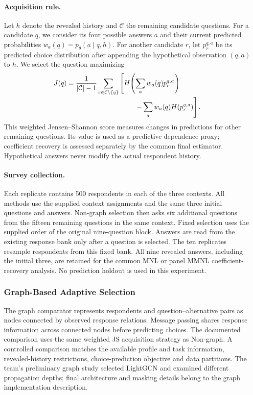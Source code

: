 \paragraph{Acquisition rule.}
Let $h$ denote the revealed history and $\mathcal C$ the remaining candidate
questions. For a candidate $q$, we consider its four possible answers $a$ and
their current predicted probabilities $w_a(q)=p_\theta(a\mid q,h)$.
For another candidate $r$, let $p_r^{q,a}$ be its predicted choice distribution
after appending the hypothetical observation $(q,a)$ to $h$. We select the
question maximizing
\begin{equation}
\begin{aligned}
 J(q) &= \frac{1}{|\mathcal C|-1}
     \sum_{r\in\mathcal C\setminus\{q\}}\left[
       H\!\left(\sum_a w_a(q)p_r^{q,a}\right)\right.\\[-2pt]
 &\hspace{35mm}\left.-\sum_a w_a(q)H(p_r^{q,a})\right].
\end{aligned}
\end{equation}
This weighted Jensen--Shannon score measures changes in predictions for other
remaining questions. Its value is used as a predictive-dependence proxy;
coefficient recovery is assessed separately by the common final estimator.
Hypothetical answers never modify the actual respondent history.

\paragraph{Survey collection.}
Each replicate contains 500 respondents in each of the three contexts. All
methods use the supplied context assignments and the same three initial
questions and answers. Non-graph selection then asks six additional questions
from the fifteen remaining questions in the same context. Fixed selection uses
the supplied order of the original nine-question block. Answers are read from
the existing response bank only after a question is selected. The ten
replicates resample respondents from this fixed bank. All nine revealed answers,
including the initial three, are retained for the common MNL or panel MMNL
coefficient-recovery analysis. No prediction holdout is used in this experiment.

\subsubsection{Graph-Based Adaptive Selection}

The graph comparator represents respondents and question--alternative pairs
as nodes connected by observed response relations. Message passing shares
response information across connected nodes before predicting choices.
The documented comparison uses the same weighted JS acquisition strategy as
Non-graph. A controlled comparison matches the available profile and task
information, revealed-history restrictions, choice-prediction objective and
data partitions. The team's preliminary graph study selected LightGCN and
examined different propagation depths; final architecture and masking details
belong to the graph implementation description.

